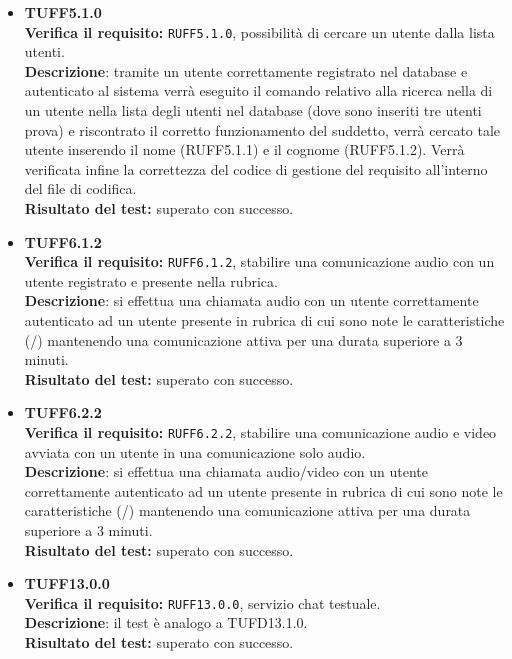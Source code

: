 \begin{itemize}
\item \textbf{TUFF5.1.0}\\
\textbf{Verifica il requisito:} \texttt{RUFF5.1.0}, possibilità di cercare un utente dalla lista utenti.\\
\textbf{Descrizione}: tramite un utente  correttamente registrato nel database e autenticato al sistema verrà eseguito il comando relativo alla ricerca nella di un utente nella lista degli utenti nel database (dove sono inseriti tre utenti prova) e riscontrato il corretto funzionamento del suddetto, verrà cercato tale utente inserendo il nome (RUFF5.1.1) e il cognome (RUFF5.1.2). Verrà verificata infine la correttezza del codice di gestione del requisito all'interno del file di codifica.\\
\textbf{Risultato del test:} superato con successo.

\item \textbf{TUFF6.1.2}\\ 
\textbf{Verifica il requisito:} \texttt{RUFF6.1.2}, stabilire una comunicazione audio con un utente registrato e presente nella rubrica.\\
\textbf{Descrizione}: si effettua una chiamata audio con un utente  correttamente autenticato ad un utente  presente in rubrica di cui sono note le caratteristiche (/) mantenendo una comunicazione attiva per una durata superiore a 3 minuti.\\
\textbf{Risultato del test:} superato con successo.

\item \textbf{TUFF6.2.2}\\
\textbf{Verifica il requisito:} \texttt{RUFF6.2.2}, stabilire una comunicazione audio e video avviata con un utente in una comunicazione solo audio.\\
\textbf{Descrizione}: si effettua una chiamata audio/video con un utente  correttamente autenticato ad un utente  presente in rubrica di cui sono note le caratteristiche (/) mantenendo una comunicazione attiva per una durata superiore a 3 minuti.\\
\textbf{Risultato del test:} superato con successo.

\item \textbf{TUFF13.0.0}\\
\textbf{Verifica il requisito:} \texttt{RUFF13.0.0}, servizio chat testuale.\\
\textbf{Descrizione}: il test è analogo a TUFD13.1.0.\\
\textbf{Risultato del test:} superato con successo.


\end{itemize}
